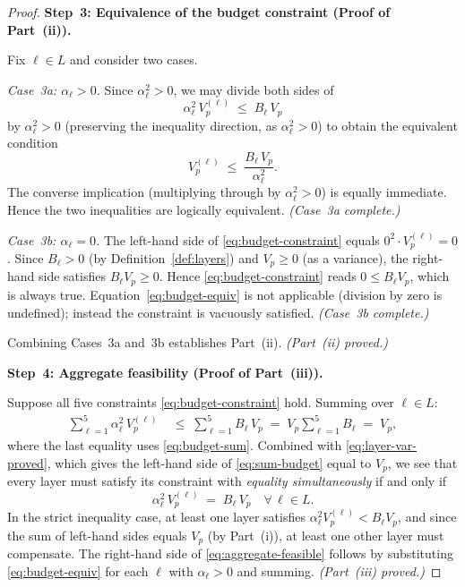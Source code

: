 \documentclass[12pt,openany]{book}
\numberwithin{equation}{chapter}
\theoremstyle{plain}
\theoremstyle{definition}
\theoremstyle{remark}
\def\mathcal#1{#1}%
\begin{document}
\begin{proof}
\medskip
\noindent\textbf{Step~3: Equivalence of the budget constraint
(Proof of Part~(ii)).}

Fix $\ell \in \mathcal{L}$ and consider two cases.

\medskip
\noindent\textit{Case~3a: $\alpha_\ell > 0$.}
Since $\alpha_\ell^2 > 0$, we may divide both sides of
\begin{equation}
  \alpha_\ell^2\, V_p^{(\ell)} \;\leq\; B_\ell\, V_p
\end{equation}
by $\alpha_\ell^2 > 0$ (preserving the inequality direction,
as $\alpha_\ell^2 > 0$) to obtain the equivalent condition
\begin{equation}
  V_p^{(\ell)} \;\leq\; \frac{B_\ell\, V_p}{\alpha_\ell^2}.
\end{equation}
The converse implication (multiplying through by $\alpha_\ell^2 > 0$)
is equally immediate.  Hence the two inequalities are logically
equivalent. \hfill\textit{(Case~3a complete.)}

\medskip
\noindent\textit{Case~3b: $\alpha_\ell = 0$.}
The left-hand side of \eqref{eq:budget-constraint} equals
$0^2 \cdot V_p^{(\ell)} = 0$.
Since $B_\ell > 0$ (by Definition~\ref{def:layers}) and
$V_p \geq 0$ (as a variance), the right-hand side satisfies
$B_\ell V_p \geq 0$.  Hence \eqref{eq:budget-constraint} reads
$0 \leq B_\ell V_p$, which is always true.
Equation~\eqref{eq:budget-equiv} is not applicable
(division by zero is undefined); instead the constraint is
vacuously satisfied.
\hfill\textit{(Case~3b complete.)}

\noindent Combining Cases~3a and~3b establishes Part~(ii).
\hfill\textit{(Part~(ii) proved.)}

\medskip
\noindent\textbf{Step~4: Aggregate feasibility
(Proof of Part~(iii)).}

Suppose all five constraints \eqref{eq:budget-constraint} hold.
Summing over $\ell \in \mathcal{L}$:
\begin{align}
  \sum_{\ell=1}^{5} \alpha_\ell^2\, V_p^{(\ell)}
  &\;\leq\;
  \sum_{\ell=1}^{5} B_\ell\, V_p
  \;=\;
  V_p \sum_{\ell=1}^{5} B_\ell
  \;=\;
  V_p,
  \label{eq:sum-budget}
\end{align}
where the last equality uses \eqref{eq:budget-sum}.  Combined with
\eqref{eq:layer-var-proved}, which gives the left-hand side of
\eqref{eq:sum-budget} equal to $V_p$, we see that every layer
must satisfy its constraint with \emph{equality simultaneously}
if and only if
\begin{equation}
  \alpha_\ell^2\, V_p^{(\ell)} \;=\; B_\ell\, V_p
  \quad \forall\, \ell \in \mathcal{L}.
  \label{eq:tight}
\end{equation}
In the strict inequality case, at least one layer satisfies
$\alpha_\ell^2 V_p^{(\ell)} < B_\ell V_p$, and since the sum
of left-hand sides equals $V_p$ (by Part~(i)), at least one
other layer must compensate.  The right-hand side of
\eqref{eq:aggregate-feasible} follows by substituting
\eqref{eq:budget-equiv} for each $\ell$ with $\alpha_\ell > 0$
and summing. \hfill\textit{(Part~(iii) proved.)}


\end{proof}
\end{document}

